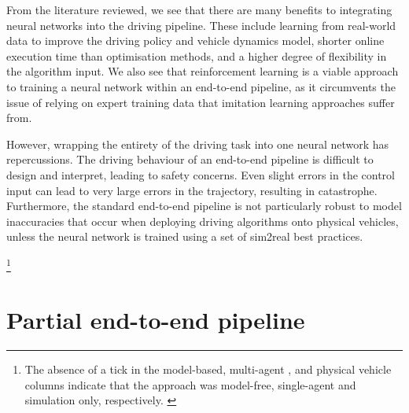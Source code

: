From the literature reviewed, we see that there are many benefits to integrating neural networks into the driving pipeline.
These include learning from real-world data to improve the driving policy and vehicle dynamics model, shorter online execution time than optimisation methods, and a higher degree of flexibility in the algorithm input.
We also see that reinforcement learning is a viable approach to training a neural network within an end-to-end pipeline, as it circumvents the issue of relying on expert training data that imitation learning approaches suffer from.

However, wrapping the entirety of the driving task into one neural network has repercussions.
The driving behaviour of an end-to-end pipeline is difficult to design and interpret, leading to safety concerns.
Even slight errors in the control input can lead to very large errors in the trajectory, resulting in catastrophe.
Furthermore, the standard end-to-end pipeline is not particularly robust to model inaccuracies that occur when deploying driving algorithms onto physical vehicles, unless the neural network is trained using a set of sim2real best practices.

\begin{landscape}
    
    \footnote{The absence of a tick in the model-based, multi-agent , and physical vehicle columns indicate that the approach was model-free, single-agent and simulation only, respectively. \label{footnote_1}}
\end{landscape}



\section{Partial end-to-end pipeline}
\label{sec:partial_end_to_end}



